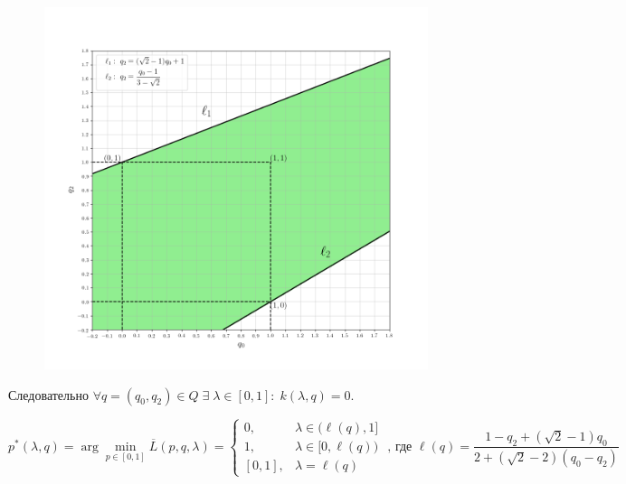 \begin{flushleft}
	\begin{figure}[H]
		\centering
  		\includegraphics[scale=0.4]{images/graf_3_1}
  		\caption{}
	\end{figure}
	
	Следовательно $\forall q=(q_0, q_2) \in Q \;
	\exists \; \lambda \in [0,1]: \; k(\lambda,q)=0$.
	
	$$
		p^*(\lambda,q)=
		\arg \min \limits_{p \in [0, 1]} \overline{L}(p,q,\lambda)=
		\begin{cases}
			0, & \lambda \in \big(\ell (q), 1\big] \\
			1, & \lambda \in \big[0, \ell(q) \big) \\
			[0,1], & \lambda=\ell(q)
		\end{cases}
		\textrm{ , где } \ell(q)=
		\frac{1 - q_2 + (\sqrt{2} - 1)q_0}{2+(\sqrt{2}-2)(q_0-q_2)}
	$$	
	
\end{flushleft}